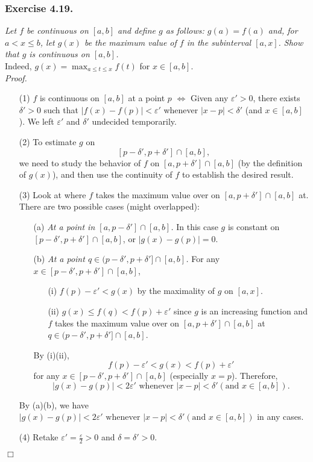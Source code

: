 \documentclass{article}
\begin{document}
\subsubsection*{Exercise 4.19.}
\emph{Let $f$ be continuous on $[a,b]$ and define $g$ as follows:
$g(a) = f(a)$ and, for $a < x \leq b$,
let $g(x)$ be the maximum value of $f$ in the subinterval $[a,x]$.
Show that $g$ is continuous on $[a,b]$.} \\

Indeed, $g(x) = \max_{a \leq t \leq x} f(t)$ for $x \in [a,b]$. \\

\emph{Proof.}
\begin{enumerate}
\item[(1)]
$f$ is continuous on $[a,b]$ at a point $p$ $\Longleftrightarrow$
Given any $\varepsilon' > 0$, there exists $\delta' > 0$ such that
$|f(x) - f(p)| < \varepsilon'$ whenever $|x-p| < \delta'$ (and $x \in [a,b]$).
We left $\varepsilon'$ and $\delta'$ undecided temporarily.
\item[(2)]
To estimate $g$ on
$$[p-\delta', p+\delta'] \cap [a,b],$$
we need to study the behavior of $f$ on $[a,p+\delta'] \cap [a,b]$
(by the definition of $g(x)$),
and then use the continuity of $f$ to establish the desired result.
\item[(3)]
Look at where $f$ takes the maximum value over on $[a,p+\delta'] \cap [a,b]$ at.
There are two possible cases (might overlapped):
  \begin{enumerate}
  \item[(a)]
  \emph{At a point in $[a,p-\delta'] \cap [a,b]$.}
  In this case $g$ is constant on $[p-\delta', p+\delta'] \cap [a,b]$,
  or $|g(x) - g(p)| = 0$.
  \item[(b)]
  \emph{At a point $q \in (p-\delta',p+\delta'] \cap [a,b]$.}
  For any $x \in [p-\delta', p+\delta'] \cap [a,b]$,
    \begin{enumerate}
    \item[(i)]
    $f(p) - \varepsilon' < g(x)$ by the maximality of $g$ on $[a,x]$.
    \item[(ii)]
    $g(x) \leq f(q) < f(p) + \varepsilon'$
    since $g$ is an increasing function and
    $f$ takes the maximum value over on $[a,p+\delta'] \cap [a,b]$ at
    $q \in (p-\delta',p+\delta'] \cap [a,b]$.
    \end{enumerate}
  By (i)(ii),
  $$f(p) - \varepsilon' < g(x) < f(p) + \varepsilon'$$
  for  any $x \in [p-\delta', p+\delta'] \cap [a,b]$ (especially $x = p$).
  Therefore,
  $$|g(x) - g(p)| < 2 \varepsilon'
  \text{ whenever } |x-p| < \delta' (\text{and } x \in [a,b]).$$

  \end{enumerate}
  By (a)(b), we have
  $|g(x) - g(p)| < 2 \varepsilon'
  \text{ whenever } |x-p| < \delta' (\text{and } x \in [a,b])$ in any cases.
\item[(4)]
Retake $\varepsilon' = \frac{\varepsilon}{2} > 0$ and $\delta = \delta' > 0$.
\end{enumerate}
$\Box$ \\\\
\end{document}
